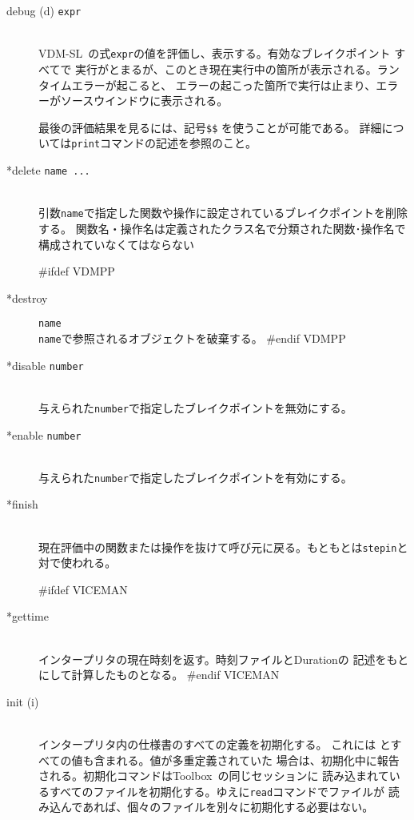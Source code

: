 \documentclass[\pformat,12pt]{article}
\newcommand{\vdmslpp}{VDM-SL}
\newcommand{\Toolbox}{Toolbox}
\newcommand{\vdmslpp}{VDM++}
\newcommand{\Toolbox}{Toolbox}
\begin{document}
\begin{description}
\item[debug (d) {\tt expr}]  \mbox{}\\
  \vdmslpp\ の式{\tt expr}の値を評価し、表示する。有効なブレイクポイント すべてで
  実行がとまるが、このとき現在実行中の箇所が表示される。ランタイムエラーが起こると、
  エラーの起こった箇所で実行は止まり、エラーがソースウインドウに表示される。
  
  最後の評価結果を見るには、記号{\tt \$\$}\index{\$\$} を使うことが可能である。
  詳細については{\tt print}コマンドの記述を参照のこと。
    
\item[*delete {\tt name ...}] \mbox{}\\
    引数{\tt name}で指定した関数や操作に設定されているブレイクポイントを削除する。
    {%
        関数名・操作名は定義されたクラス名で分類された関数･操作名で構成されていなくてはならない
    }%
    {}%
    
#ifdef VDMPP
\item[*destroy] {\tt name}\mbox{}\\
  {\tt name}で参照されるオブジェクトを破棄する。
#endif VDMPP

\item[*disable \texttt{number}]
\mbox{}\\
  与えられた{\tt number}で指定したブレイクポイントを無効にする。

\item[*enable \texttt{number}]
\mbox{}\\
  与えられた{\tt number}で指定したブレイクポイントを有効にする。

\item[*finish]\mbox{}\\
  現在評価中の関数または操作を抜けて呼び元に戻る。もともとは{\tt stepin}と対で使われる。

#ifdef VICEMAN
\item[*gettime]\mbox{}\\
  インタープリタの現在時刻を返す。時刻ファイルとDurationの
  記述をもとにして計算したものとなる。
#endif VICEMAN

\item[init (i)] \mbox{}\\
  インタープリタ内の仕様書のすべての定義を初期化する。
  これには
  とすべての値も含まれる。値が多重定義されていた
  場合は、初期化中に報告される。初期化コマンドは\Toolbox\ の同じセッションに
  読み込まれているすべてのファイルを初期化する。ゆえに{\tt read}コマンドでファイルが
  読み込んであれば、個々のファイルを別々に初期化する必要はない。


\end{description}
\end{document}
